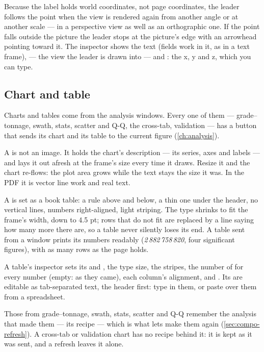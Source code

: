 Because the label holds world coordinates, not page coordinates, the leader follows the point when the view is rendered again from another angle or at another scale — in a perspective view as well as an orthographic one. If the point falls outside the picture the leader stops at the picture's edge with an arrowhead pointing toward it. The inspector shows the text (fields work in it, as in a text frame),  — the view the leader is drawn into — and : the x, y and z, which you can type.

\subsection{Chart and table}

Charts and tables come from the analysis windows. Every one of them — grade–tonnage, swath, stats, scatter and Q-Q, the cross-tab, validation — has a  button that sends its chart and its table to the current figure (\cref{ch:analysis}).

A  is not an image. It holds the chart's description — its series, axes and labels — and lays it out afresh at the frame's size every time it draws. Resize it and the chart re-flows: the plot area grows while the text stays the size it was. In the PDF it is vector line work and real text.

A  is set as a book table: a rule above and below, a thin one under the header, no vertical lines, numbers right-aligned, light striping. The type shrinks to fit the frame's width, down to 4.5 pt; rows that do not fit are replaced by a line saying how many more there are, so a table never silently loses its end. A table sent from a window prints its numbers readably (\emph{2\,882\,758\,820}, four significant figures), with as many rows as the page holds.

A table's inspector sets its  and , the type size, the stripes, the number of  for every number (empty: as they came), each column's alignment, and . Its  are editable as tab-separated text, the header first: type in them, or paste over them from a spreadsheet.

Those from grade–tonnage, swath, stats, scatter and Q-Q remember the analysis that made them — its recipe — which is what lets  make them again (\cref{sec:compo-refresh}). A cross-tab or validation chart has no recipe behind it: it is kept as it was sent, and a refresh leaves it alone.

